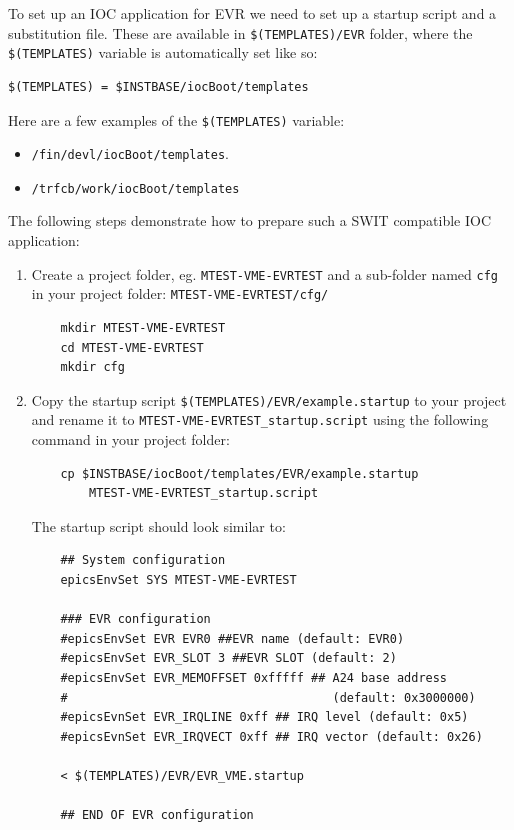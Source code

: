 \documentclass[12pt,a4paper]{article}
\begin{document}
To set up an IOC application for EVR we need to set up a startup script and a substitution file. These are available in \texttt{\$(TEMPLATES)/EVR} folder, where the \texttt{\$(TEMPLATES)} variable is automatically set like so: 
\begin{verbatim}
$(TEMPLATES) = $INSTBASE/iocBoot/templates
\end{verbatim}
Here are a few examples of the \texttt{\$(TEMPLATES)} variable:
\begin{itemize}
\item \texttt{/fin/devl/iocBoot/templates}.
\item \texttt{/trfcb/work/iocBoot/templates}
\end{itemize}
The following steps demonstrate how to prepare such a SWIT compatible IOC application:
\begin{enumerate}

	\item Create a project folder, eg. \texttt{MTEST-VME-EVRTEST} and a sub-folder named \texttt{cfg} in your project folder: \texttt{MTEST-VME-EVRTEST/cfg/}
\begin{verbatim}
	mkdir MTEST-VME-EVRTEST
	cd MTEST-VME-EVRTEST
	mkdir cfg
\end{verbatim}

	\item Copy the startup script \newline \texttt{\$(TEMPLATES)/EVR/example.startup} to your project and rename it to \texttt{MTEST-VME-EVRTEST\_startup.script} using the following command in your project folder:
\begin{verbatim}
	cp $INSTBASE/iocBoot/templates/EVR/example.startup 
	    MTEST-VME-EVRTEST_startup.script
\end{verbatim}

	The startup script should look similar to:
\begin{verbatim}
	## System configuration
	epicsEnvSet SYS MTEST-VME-EVRTEST
	
	### EVR configuration
	#epicsEnvSet EVR EVR0 ##EVR name (default: EVR0)
	#epicsEnvSet EVR_SLOT 3 ##EVR SLOT (default: 2)
	#epicsEnvSet EVR_MEMOFFSET 0xfffff ## A24 base address
	#                                     (default: 0x3000000)
	#epicsEvnSet EVR_IRQLINE 0xff ## IRQ level (default: 0x5)
	#epicsEvnSet EVR_IRQVECT 0xff ## IRQ vector (default: 0x26)
	
	< $(TEMPLATES)/EVR/EVR_VME.startup
	
	## END OF EVR configuration
\end{verbatim}


\end{enumerate}
\end{document}

